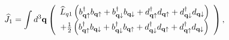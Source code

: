 \begin{equation*}
\widehat{J}_{1}=\int d^{3}\mathbf{q}\left( 
\begin{array}{c}
\widehat{L}_{q1}\left( b_{\mathbf{q}\uparrow }^{\dagger }b_{\mathbf{q}%
\uparrow }+b_{\mathbf{q}\downarrow }^{\dagger }b_{\mathbf{q}\downarrow }+d_{%
\mathbf{q}\uparrow }^{\dagger }d_{\mathbf{q}\uparrow }+d_{\mathbf{q}%
\downarrow }^{\dagger }d_{\mathbf{q}\downarrow }\right) \\ 
+\frac{1}{2}\left( b_{\mathbf{q}\uparrow }^{\dagger }b_{\mathbf{q}\downarrow
}+b_{\mathbf{q}\downarrow }^{\dagger }b_{\mathbf{q}\uparrow }+d_{\mathbf{q}%
\downarrow }^{\dagger }d_{\mathbf{q}\uparrow }+d_{\mathbf{q}\uparrow
}^{\dagger }d_{\mathbf{q}\downarrow }\right)
\end{array}
\right) ,
\end{equation*}

